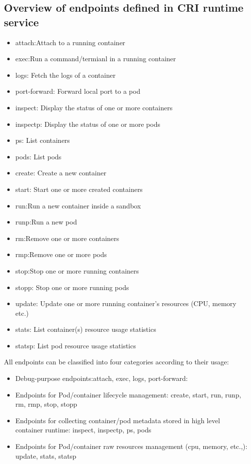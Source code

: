 \subsection{Overview of endpoints defined in CRI runtime service}
\begin{itemize}
    \item  attach:Attach to a running container
    \item  exec:Run a command/termianl in a running container
    \item  logs: Fetch the logs of a container
    \item  port-forward: Forward local port to a pod

    \item  inspect: Display the status of one or more containers
    \item  inspectp: Display the status of one or more pods
    \item  ps:  List containers
    \item  pods: List pods
    
    \item  create: Create a new container
    \item  start: Start one or more created containers
    \item  run:Run a new container inside a sandbox
    \item  runp:Run a new pod
    \item  rm:Remove one or more containers
    \item  rmp:Remove one or more pods
    \item  stop:Stop one or more running containers
    \item  stopp: Stop one or more running pods

    \item  update: Update one or more running container's resources (CPU, memory etc.)
    \item  stats: List container(s) resource usage statistics
    \item  statsp: List pod resource usage statistics
\end{itemize}

All endpoints can be classified into four categories according to their usage:
\begin{itemize}
    \item  Debug-purpose endpoints:attach, exec, logs, port-forward:
    \item  Endpoints for Pod/container lifecycle management: create, start, run, runp, rm, rmp, stop, stopp
    \item  Endpoints for collecting container/pod metadata stored in high level container runtime: inspect, inspectp, ps, pods
    \item  Endpoints for Pod/container raw resources management (cpu, memory, etc.,): update, stats, statsp
\end{itemize}

